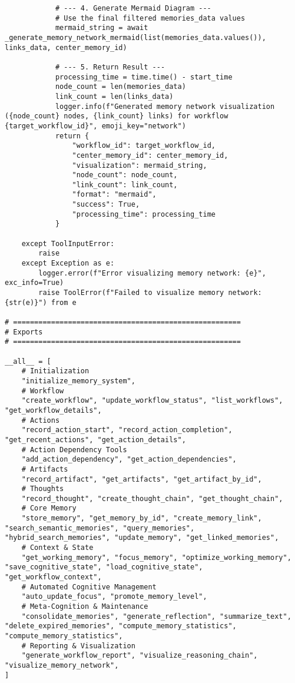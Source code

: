 \documentclass[12pt,a4paper]{article}
\begin{document}
\begin{pageablecode}
\begin{verbatim}
            # --- 4. Generate Mermaid Diagram ---
            # Use the final filtered memories_data values
            mermaid_string = await _generate_memory_network_mermaid(list(memories_data.values()), links_data, center_memory_id)

            # --- 5. Return Result ---
            processing_time = time.time() - start_time
            node_count = len(memories_data)
            link_count = len(links_data)
            logger.info(f"Generated memory network visualization ({node_count} nodes, {link_count} links) for workflow {target_workflow_id}", emoji_key="network")
            return {
                "workflow_id": target_workflow_id,
                "center_memory_id": center_memory_id,
                "visualization": mermaid_string,
                "node_count": node_count,
                "link_count": link_count,
                "format": "mermaid",
                "success": True,
                "processing_time": processing_time
            }

    except ToolInputError:
        raise
    except Exception as e:
        logger.error(f"Error visualizing memory network: {e}", exc_info=True)
        raise ToolError(f"Failed to visualize memory network: {str(e)}") from e

# ======================================================
# Exports
# ======================================================

__all__ = [
    # Initialization
    "initialize_memory_system",
    # Workflow
    "create_workflow", "update_workflow_status", "list_workflows", "get_workflow_details",
    # Actions
    "record_action_start", "record_action_completion", "get_recent_actions", "get_action_details", 
    # Action Dependency Tools
    "add_action_dependency", "get_action_dependencies",
    # Artifacts
    "record_artifact", "get_artifacts", "get_artifact_by_id",
    # Thoughts
    "record_thought", "create_thought_chain", "get_thought_chain",
    # Core Memory
    "store_memory", "get_memory_by_id", "create_memory_link", "search_semantic_memories", "query_memories", "hybrid_search_memories", "update_memory", "get_linked_memories", 
    # Context & State
    "get_working_memory", "focus_memory", "optimize_working_memory", "save_cognitive_state", "load_cognitive_state", "get_workflow_context",
    # Automated Cognitive Management
    "auto_update_focus", "promote_memory_level",
    # Meta-Cognition & Maintenance
    "consolidate_memories", "generate_reflection", "summarize_text", "delete_expired_memories", "compute_memory_statistics", "compute_memory_statistics",
    # Reporting & Visualization
    "generate_workflow_report", "visualize_reasoning_chain", "visualize_memory_network",
]



\end{verbatim}
\end{pageablecode}
\end{document}
